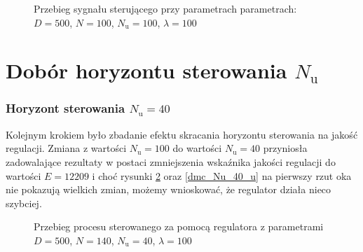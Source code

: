 \begin{figure}[b]
    \centering
    \caption{Przebieg sygnału sterującego przy parametrach parametrach: $D = 500$, $N = 100$, $N_{\mathrm{u}} = 100$, $\lambda = 100$}
    \label{dmc_N_100_u}
\end{figure}
\FloatBarrier

\section{Dobór horyzontu sterowania $N_{\mathrm{u}}$}
\subsubsection{Horyzont sterowania $N_{\mathrm{u}} = 40$}
Kolejnym krokiem było zbadanie efektu skracania horyzontu sterowania na jakość regulacji. Zmiana z wartości $N_{\mathrm{u}} = 100$ do wartości $N_{\mathrm{u}} = 40$ przyniosła zadowalające rezultaty w postaci zmniejszenia wskaźnika jakości regulacji do wartości $E = \num{12209}$ i choć rysunki \ref{dmc_Nu_40_y} oraz \ref{dmc_Nu_40_u} na pierwszy rzut oka nie pokazują wielkich zmian, możemy wnioskować, że regulator działa nieco szybciej.

\begin{figure}[t]
    \centering
    \caption{Przebieg procesu sterowanego za pomocą regulatora z parametrami $D = 500$, $N = 140$, $N_{\mathrm{u}} = 40$, $\lambda = 100$}
    \label{dmc_Nu_40_y}
\end{figure}

